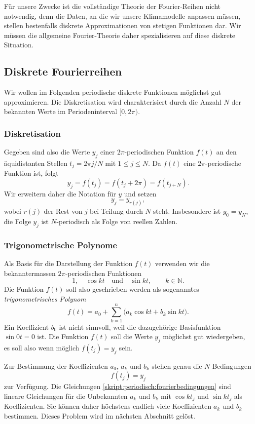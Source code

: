 Für unsere Zwecke ist die vollständige Theorie der Fourier-Reihen nicht
notwendig, denn die Daten, an die wir unsere Klimamodelle anpassen
müssen, stellen bestenfalls diskrete Approximationen von stetigen
Funktionen dar.
Wir müssen die allgemeine Fourier-Theorie daher spezialisieren auf diese
diskrete Situation.

\subsection{Diskrete Fourierreihen}
Wir wollen im Folgenden periodische diskrete Funktionen möglichst gut
approximieren.
Die Diskretisation wird charakterisiert durch die Anzahl
$N$ der bekannten Werte im Periodeninterval $[0,2\pi)$.

\subsubsection{Diskretisation}
Gegeben sind also die Werte $y_j$ einer $2\pi$-periodischen Funktion
$f(t)$ an den äquidistanten Stellen $t_j=2\pi j/N$ mit
$1\le j \le N$.
Da $f(t)$ eine $2\pi$-periodische Funktion ist, folgt
\[
y_j = f(t_j) = f(t_j+2\pi) = f(t_{j+N}).
\]
Wir erweitern daher die Notation für $y$ und setzen
\[
y_j = y_{r(j)},
\]
wobei $r(j)$ der Rest von $j$ bei Teilung durch $N$ steht.
Insbesondere ist $y_0=y_N$, die Folge $y_j$ ist $N$-periodisch als
Folge von reellen Zahlen.

\subsubsection{Trigonometrische Polynome}
Als Basis für die Darstellung der Funktion $f(t)$ verwenden wir
die bekanntermassen
$2\pi$-periodischen Funktionen 
\begin{equation}
1,\quad \cos kt\quad\text{und}\quad \sin kt,\qquad k\in\mathbb N.
\end{equation}
Die Funktion $f(t)$ soll also geschrieben werden als sogenanntes 
{\em trigonometrisches Polynom}
%
\begin{equation}
f(t)
=
a_0 + \sum_{k=1}^n \bigl(a_k \cos kt + b_k\sin kt).
\label{skript:fourier:rekonstruktion}
\end{equation}
Ein Koeffizient $b_0$ ist nicht sinnvoll, weil die dazugehörige Basisfunktion
$\sin 0t =0$ ist.
Die Funktion $f(t)$ soll die Werte $y_j$
möglichst gut wiedergeben, es soll also wenn möglich $f(t_j) = y_j$ sein.

Zur Bestimmung der Koeffizienten $a_0$, $a_k$ und $b_k$ stehen genau
die $N$ Bedingungen
\begin{equation}
f(t_j)=y_j
\label{skript:periodisch:fourierbedingungen}
\end{equation}
zur Verfügung.
Die Gleichungen \eqref{skript:periodisch:fourierbedingungen} sind
lineare Gleichungen für die Unbekannten $a_k$ und $b_k$ mit
$\cos kt_j$ und $\sin kt_j$ als Koeffizienten.
Sie können daher höchstens endlich viele Koeffizienten $a_k$ und $b_k$
bestimmen.
Dieses Problem wird im nächsten Abschnitt gelöst.

